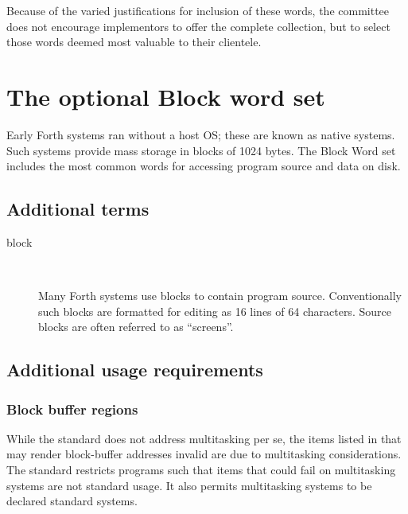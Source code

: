 Because of the varied justifications for inclusion of these words,
the committee does not encourage implementors to offer the complete
collection, but to select those words deemed most valuable to their
clientele.



\section{The optional Block word set} %
\label{rat:block}

Early Forth systems ran without a host OS; these are known as native
systems.  Such systems provide mass storage in blocks of 1024 bytes.
The Block Word set includes the most common words for accessing
program source and data on disk.


\setcounter{subsection}{1}
\subsection{Additional terms} %

\begin{description}
\item[block] ~

	Many Forth systems use blocks to contain program source.
	Conventionally such blocks are formatted for editing as
	16 lines of 64 characters. Source blocks are often referred
	to as ``screens''.
\end{description}

\subsection{Additional usage requirements}
\setcounter{subsubsection}{1}
\subsubsection{Block buffer regions}
\label{rat:block:buffers}

	While the standard does not address multitasking per se, the
	items listed in  that may render block-buffer
	addresses invalid are due to multitasking considerations.
	The standard restricts programs such that items that could fail on
	multitasking systems are not standard usage.  It also permits
	multitasking systems to be declared standard systems.

